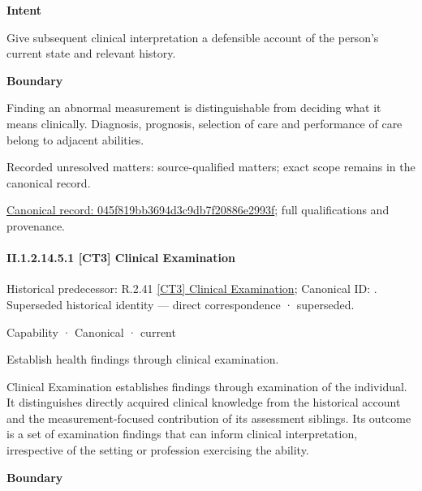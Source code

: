 \textbf{Intent}



Give subsequent clinical interpretation a defensible account of the person's current state and relevant history.



\textbf{Boundary}



Finding an abnormal measurement is distinguishable from deciding what it means clinically. Diagnosis, prognosis, selection of care and performance of care belong to adjacent abilities.


{\small Recorded unresolved matters: source-qualified matters; exact scope remains in the canonical record.}\par
{\footnotesize \href{../../../../continuum/strategy/capability/045f819bb3694d3c9db7f20886e2993f.md}{Canonical record: 045f819bb3694d3c9db7f20886e2993f}; full qualifications and provenance.}\par
\paragraph*{II.1.2.14.5.1 [CT3] Clinical Examination}
\label{navigation:II.1.2.14.5.1}

{\small Historical predecessor: R.2.41 \hyperref[element:8bc15e2b8f114deebcbbe3f2013a8147]{[CT3] Clinical Examination}; Canonical ID: \texttt{}. Superseded historical identity — direct correspondence · superseded.}\par
\label{element:8855d4d9e2954e0ab66ab65a556fc61a}
{\small Capability · Canonical · current}\par

Establish health findings through clinical examination.



Clinical Examination establishes findings through examination of the individual. It distinguishes directly acquired clinical knowledge from the historical account and the measurement-focused contribution of its assessment siblings. Its outcome is a set of examination findings that can inform clinical interpretation, irrespective of the setting or profession exercising the ability.



\textbf{Boundary}



